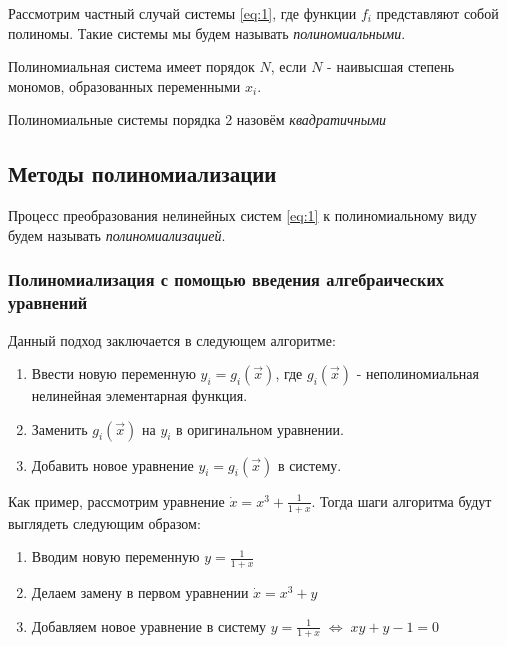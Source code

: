 \begin{definition}
    Рассмотрим частный случай системы \ref{eq:1}, где функции $f_i$ представляют собой полиномы. Такие системы мы будем называть \textit{полиномиальными}.
\end{definition}

\begin{definition}
    Полиномиальная система имеет порядок $N$, если $N$ - наивысшая степень мономов, образованных переменными $x_i$.
\end{definition}

\begin{definition}
    Полиномиальные системы порядка 2 назовём \textit{квадратичными}
\end{definition}

\subsection{Методы полиномиализации} \label{poly-methods}

\begin{definition}
    Процесс преобразования нелинейных систем \ref{eq:1} к полиномиальному виду будем называть \textit{полиномиализацией}.
\end{definition}

\subsubsection{Полиномиализация с помощью введения алгебраических уравнений} \label{poly-algebraic}

Данный подход заключается в следующем алгоритме:
\begin{enumerate}
    \item Ввести новую переменную $y_i = g_i(\vec x)$, где $g_i(\vec x)$ - неполиномиальная нелинейная элементарная функция.
    \item Заменить $g_i(\vec x)$ на $y_i$ в оригинальном уравнении.
    \item  Добавить новое уравнение $y_i = g_i(\vec x)$ в систему.
\end{enumerate}

Как пример, рассмотрим уравнение $\dot x = x^3 + \frac{1}{1 + x}$. Тогда шаги алгоритма будут выглядеть следующим образом:
\begin{enumerate}
    \item Вводим новую переменную $y = \frac{1}{1 + x}$
    \item Делаем замену в первом уравнении $\dot x = x^3 + y$
    \item  Добавляем новое уравнение в систему $y = \frac{1}{1 + x}\; \Leftrightarrow \; xy + y - 1 = 0$
\end{enumerate}

